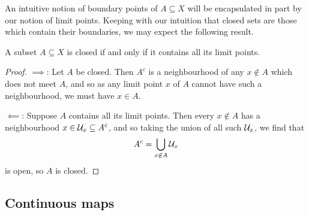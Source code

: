 \documentclass[11pt]{article}
\begin{document}
An intuitive notion of boundary points of $A \subseteq X$ will be encapsulated in part by our notion of limit points. Keeping with our intuition that closed sets are those which contain their boundaries, we may expect the following result.
\begin{proposition}
    A subset $A \subseteq X$ is closed if and only if it contains all its limit points.
\end{proposition}
\begin{proof}
    $\implies$: Let $A$ be closed. Then $A^c$ is a neighbourhood of any $x \not\in A$ which does not meet $A$, and so as any limit point $x$ of $A$ cannot have such a neighbourhood, we must have $x \in A$.

    $\impliedby$: Suppose $A$ contains all its limit points. Then every $x \not\in A$ has a neighbourhood $x \in \mathcal{U}_x \subseteq A^c$, and so taking the union of all such $\mathcal{U}_x$, we find that
    $$
        A^c = \bigcup_{x \not\in A}\mathcal{U}_x
    $$
    is open, so $A$ is closed.
\end{proof}


\subsection{Continuous maps}






\end{document}
